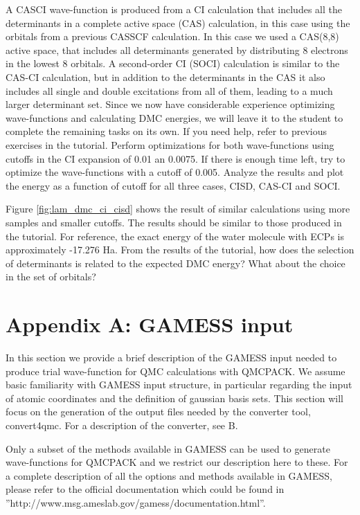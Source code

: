 A CASCI wave-function is produced from a CI calculation that includes all the determinants 
in a complete active space (CAS) calculation, in this case using the orbitals from a previous CASSCF
calculation. In this case we used a CAS(8,8) active space, that includes all determinants
generated by distributing 8 electrons in the lowest 8 orbitals. A second-order CI (SOCI) calculation is similar
to the CAS-CI calculation, but in addition to the determinants in the CAS it also includes
all single and double excitations from all of them, leading to a much larger determinant
set. Since we now have considerable experience optimizing wave-functions and calculating
DMC energies, we will leave it to the student to complete the remaining tasks on its own.
If you need help, refer to previous exercises in the tutorial. Perform optimizations for both
wave-functions using cutoffs in the CI expansion of 0.01 an 0.0075. If there is enough time
left, try to optimize the wave-functions with a cutoff of 0.005. Analyze the results and plot
the energy as a function of cutoff for all three cases, CISD, CAS-CI and SOCI.

Figure  \ref{fig:lam_dmc_ci_cisd} shows the result of similar calculations using more samples and smaller cutoffs.
The results should be similar to those produced in the tutorial. For reference, the exact
energy of the water molecule with ECPs is approximately -17.276 Ha. From the results of the
tutorial, how does the selection of determinants is related to the expected DMC energy?
What about the choice in the set of orbitals?


\newpage
\section{Appendix A: GAMESS input}
In this section we provide a brief description of the GAMESS input needed to produce
trial wave-function for QMC calculations with QMCPACK. We assume basic familiarity
with GAMESS input structure, in particular regarding the input of atomic coordinates and
the definition of gaussian basis sets. This section will focus on the generation of the output
files needed by the converter tool, convert4qmc. For a description of the converter, see B.

Only a subset of the methods available in GAMESS can be used to generate wave-functions 
for QMCPACK and we restrict our description here to these.
For a complete description of all the options and methods available
in GAMESS, please refer to the official documentation which could be found in
”http://www.msg.ameslab.gov/gamess/documentation.html”.

